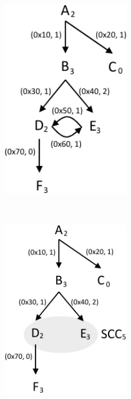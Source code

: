 \begin{figure}[t]
\centering
\begin{subfigure}{0.22\textwidth}
\centering
\includegraphics[width=0.6\textwidth]{cct-1.pdf}
\caption{}
\end{subfigure}
~
\begin{subfigure}{0.22\textwidth}
\centering
\includegraphics[width=0.6\textwidth]{cct-2.pdf}
\caption{}
\end{subfigure}

\end{figure}
